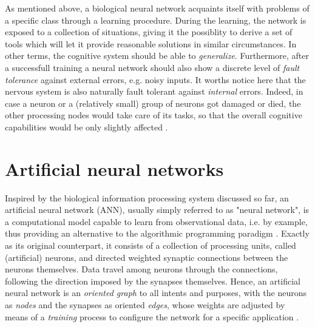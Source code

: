 \documentclass[11pt, a4paper]{report}
\numberwithin{equation}{chapter}
\theoremstyle{theorem}
\theoremstyle{definition}
\numberwithin{figure}{section}
\begin{document}
		 As mentioned above, a biological neural network acquaints itself with problems of a specific class through a learning procedure. During the learning, the network is exposed to a collection of situations, giving it the possiblity to derive a set of tools which will let it provide reasonable solutions in similar circumstances. In other terms, the cognitive system should be able to \emph{generalize}. Furthermore, after a successfull training a neural network should also show a discrete level of \emph{fault tolerance} against external errors, e.g. noisy inputs. It worths notice here that the nervous system is also naturally fault tolerant against \emph{internal} errors. Indeed, in case a neuron or a (relatively small) group of neurons got damaged or died, the other processing nodes would take care of its tasks, so that the overall cognitive capabilities would be only slightly affected \cite{Kri}. 
		 
		
	\section{Artificial neural networks}
	\label{section:Artificial neural networks}
			
		Inspired by the biological information processing system discussed so far, an artificial neural network (ANN), usually simply referred to as "neural network", is a computational model capable to learn from observational data, i.e. by example, thus providing an alternative to the algorithmic programming paradigm \cite{Nie15}. Exactly as its original counterpart, it consists of a collection of processing units, called (artificial) neurons, and directed weighted synaptic connections between the neurons themselves. Data travel among neurons through the connections, following the direction imposed by the synapses themselves. Hence, an artificial neural network is an \emph{oriented graph} to all intents and purposes, with the neurons as \emph{nodes} and the synapses as oriented \emph{edges}, whose weights are adjusted by means of a \emph{training} process to configure the network for a specific application \cite{SD}. 
		
\end{document}
